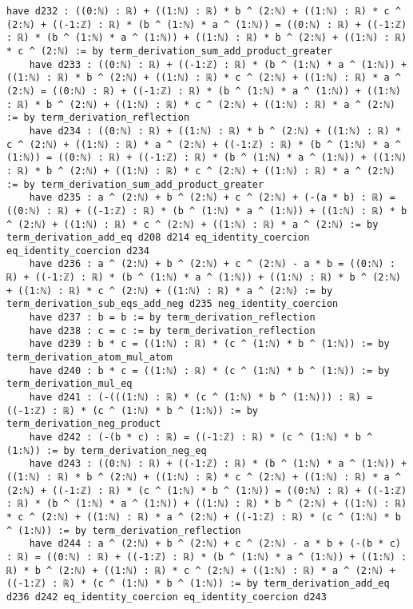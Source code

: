 \documentclass{article}
\begin{document}
\begin{tcolorbox}[colback=white!10, width=\linewidth]
\begin{lstlisting}[language=Lean4]
    have d232 : ((0:ℕ) : ℝ) + ((1:ℕ) : ℝ) * b ^ (2:ℕ) + ((1:ℕ) : ℝ) * c ^ (2:ℕ) + ((-1:ℤ) : ℝ) * (b ^ (1:ℕ) * a ^ (1:ℕ)) = ((0:ℕ) : ℝ) + ((-1:ℤ) : ℝ) * (b ^ (1:ℕ) * a ^ (1:ℕ)) + ((1:ℕ) : ℝ) * b ^ (2:ℕ) + ((1:ℕ) : ℝ) * c ^ (2:ℕ) := by term_derivation_sum_add_product_greater
    have d233 : ((0:ℕ) : ℝ) + ((-1:ℤ) : ℝ) * (b ^ (1:ℕ) * a ^ (1:ℕ)) + ((1:ℕ) : ℝ) * b ^ (2:ℕ) + ((1:ℕ) : ℝ) * c ^ (2:ℕ) + ((1:ℕ) : ℝ) * a ^ (2:ℕ) = ((0:ℕ) : ℝ) + ((-1:ℤ) : ℝ) * (b ^ (1:ℕ) * a ^ (1:ℕ)) + ((1:ℕ) : ℝ) * b ^ (2:ℕ) + ((1:ℕ) : ℝ) * c ^ (2:ℕ) + ((1:ℕ) : ℝ) * a ^ (2:ℕ) := by term_derivation_reflection
    have d234 : ((0:ℕ) : ℝ) + ((1:ℕ) : ℝ) * b ^ (2:ℕ) + ((1:ℕ) : ℝ) * c ^ (2:ℕ) + ((1:ℕ) : ℝ) * a ^ (2:ℕ) + ((-1:ℤ) : ℝ) * (b ^ (1:ℕ) * a ^ (1:ℕ)) = ((0:ℕ) : ℝ) + ((-1:ℤ) : ℝ) * (b ^ (1:ℕ) * a ^ (1:ℕ)) + ((1:ℕ) : ℝ) * b ^ (2:ℕ) + ((1:ℕ) : ℝ) * c ^ (2:ℕ) + ((1:ℕ) : ℝ) * a ^ (2:ℕ) := by term_derivation_sum_add_product_greater
    have d235 : a ^ (2:ℕ) + b ^ (2:ℕ) + c ^ (2:ℕ) + (-(a * b) : ℝ) = ((0:ℕ) : ℝ) + ((-1:ℤ) : ℝ) * (b ^ (1:ℕ) * a ^ (1:ℕ)) + ((1:ℕ) : ℝ) * b ^ (2:ℕ) + ((1:ℕ) : ℝ) * c ^ (2:ℕ) + ((1:ℕ) : ℝ) * a ^ (2:ℕ) := by term_derivation_add_eq d208 d214 eq_identity_coercion eq_identity_coercion d234
    have d236 : a ^ (2:ℕ) + b ^ (2:ℕ) + c ^ (2:ℕ) - a * b = ((0:ℕ) : ℝ) + ((-1:ℤ) : ℝ) * (b ^ (1:ℕ) * a ^ (1:ℕ)) + ((1:ℕ) : ℝ) * b ^ (2:ℕ) + ((1:ℕ) : ℝ) * c ^ (2:ℕ) + ((1:ℕ) : ℝ) * a ^ (2:ℕ) := by term_derivation_sub_eqs_add_neg d235 neg_identity_coercion
    have d237 : b = b := by term_derivation_reflection
    have d238 : c = c := by term_derivation_reflection
    have d239 : b * c = ((1:ℕ) : ℝ) * (c ^ (1:ℕ) * b ^ (1:ℕ)) := by term_derivation_atom_mul_atom
    have d240 : b * c = ((1:ℕ) : ℝ) * (c ^ (1:ℕ) * b ^ (1:ℕ)) := by term_derivation_mul_eq
    have d241 : (-(((1:ℕ) : ℝ) * (c ^ (1:ℕ) * b ^ (1:ℕ))) : ℝ) = ((-1:ℤ) : ℝ) * (c ^ (1:ℕ) * b ^ (1:ℕ)) := by term_derivation_neg_product
    have d242 : (-(b * c) : ℝ) = ((-1:ℤ) : ℝ) * (c ^ (1:ℕ) * b ^ (1:ℕ)) := by term_derivation_neg_eq
    have d243 : ((0:ℕ) : ℝ) + ((-1:ℤ) : ℝ) * (b ^ (1:ℕ) * a ^ (1:ℕ)) + ((1:ℕ) : ℝ) * b ^ (2:ℕ) + ((1:ℕ) : ℝ) * c ^ (2:ℕ) + ((1:ℕ) : ℝ) * a ^ (2:ℕ) + ((-1:ℤ) : ℝ) * (c ^ (1:ℕ) * b ^ (1:ℕ)) = ((0:ℕ) : ℝ) + ((-1:ℤ) : ℝ) * (b ^ (1:ℕ) * a ^ (1:ℕ)) + ((1:ℕ) : ℝ) * b ^ (2:ℕ) + ((1:ℕ) : ℝ) * c ^ (2:ℕ) + ((1:ℕ) : ℝ) * a ^ (2:ℕ) + ((-1:ℤ) : ℝ) * (c ^ (1:ℕ) * b ^ (1:ℕ)) := by term_derivation_reflection
    have d244 : a ^ (2:ℕ) + b ^ (2:ℕ) + c ^ (2:ℕ) - a * b + (-(b * c) : ℝ) = ((0:ℕ) : ℝ) + ((-1:ℤ) : ℝ) * (b ^ (1:ℕ) * a ^ (1:ℕ)) + ((1:ℕ) : ℝ) * b ^ (2:ℕ) + ((1:ℕ) : ℝ) * c ^ (2:ℕ) + ((1:ℕ) : ℝ) * a ^ (2:ℕ) + ((-1:ℤ) : ℝ) * (c ^ (1:ℕ) * b ^ (1:ℕ)) := by term_derivation_add_eq d236 d242 eq_identity_coercion eq_identity_coercion d243

\end{lstlisting}
\end{tcolorbox}
\end{document}
